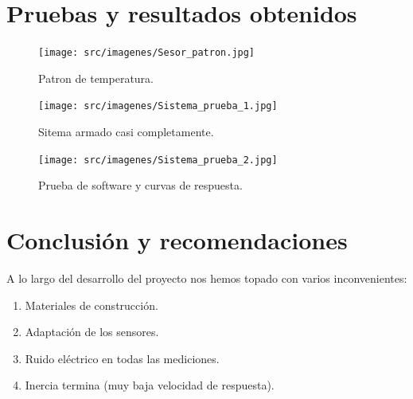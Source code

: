\documentclass[12pt]{article}
\begin{document}
\section{Pruebas y resultados obtenidos}

\begin{figure}[H]
\centering
\texttt{[image: src/imagenes/Sesor\_patron.jpg]}
\label{fgr:Sesor_patron}
\caption{Patron de temperatura.}
\end{figure}

\begin{figure}[H]
\centering
\texttt{[image: src/imagenes/Sistema\_prueba\_1.jpg]}
\label{fgr:Sitema_prueba_1}
\caption{Sitema armado casi completamente.}
\end{figure}

\begin{figure}[H]
\centering
\texttt{[image: src/imagenes/Sistema\_prueba\_2.jpg]}
\label{fgr:Sitema_prueba_2}
\caption{Prueba de software y curvas de respuesta.}
\end{figure}

\section{Conclusión y recomendaciones}

A lo largo del desarrollo del proyecto nos hemos topado con varios inconvenientes:

\begin{enumerate}
	\item Materiales de construcción.
	\item Adaptación de los sensores.
	\item Ruido eléctrico en todas las mediciones.
	\item Inercia termina (muy baja velocidad de respuesta).
\end{enumerate}
\end{document}

